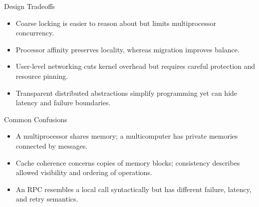 \documentclass[10pt,letterpaper]{article}
\begin{document}
\begin{studybox}{Design Tradeoffs}
\begin{itemize}
  \item Coarse locking is easier to reason about but limits multiprocessor concurrency.
  \item Processor affinity preserves locality, whereas migration improves balance.
  \item User-level networking cuts kernel overhead but requires careful protection and resource pinning.
  \item Transparent distributed abstractions simplify programming yet can hide latency and failure boundaries.
\end{itemize}
\end{studybox}

\begin{studybox}{Common Confusions}
\begin{itemize}
  \item A multiprocessor shares memory; a multicomputer has private memories connected by messages.
  \item Cache coherence concerns copies of memory blocks; consistency describes allowed visibility and ordering of operations.
  \item An RPC resembles a local call syntactically but has different failure, latency, and retry semantics.
\end{itemize}
\end{studybox}
\end{document}
